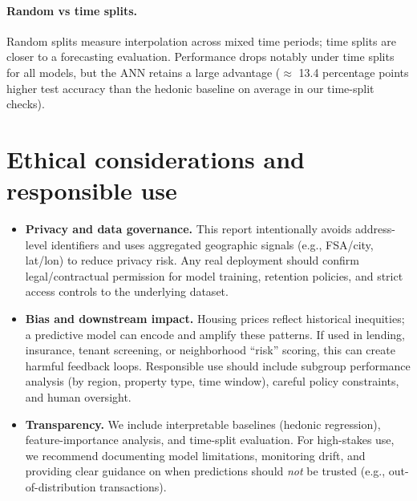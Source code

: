 \documentclass[11pt]{article}
\begin{document}
\paragraph{Random vs time splits.}
Random splits measure interpolation across mixed time periods; time splits are closer to a forecasting evaluation. Performance drops notably under time splits for all models, but the ANN retains a large advantage (\(\approx\) 13.4 percentage points higher test accuracy than the hedonic baseline on average in our time-split checks).

\section{Ethical considerations and responsible use}
\begin{itemize}[leftmargin=*]
  \item \textbf{Privacy and data governance.} This report intentionally avoids address-level identifiers and uses aggregated geographic signals (e.g., FSA/city, lat/lon) to reduce privacy risk. Any real deployment should confirm legal/contractual permission for model training, retention policies, and strict access controls to the underlying dataset.
  \item \textbf{Bias and downstream impact.} Housing prices reflect historical inequities; a predictive model can encode and amplify these patterns. If used in lending, insurance, tenant screening, or neighborhood ``risk'' scoring, this can create harmful feedback loops. Responsible use should include subgroup performance analysis (by region, property type, time window), careful policy constraints, and human oversight.
  \item \textbf{Transparency.} We include interpretable baselines (hedonic regression), feature-importance analysis, and time-split evaluation. For high-stakes use, we recommend documenting model limitations, monitoring drift, and providing clear guidance on when predictions should \emph{not} be trusted (e.g., out-of-distribution transactions).
\end{itemize}
\end{document}
